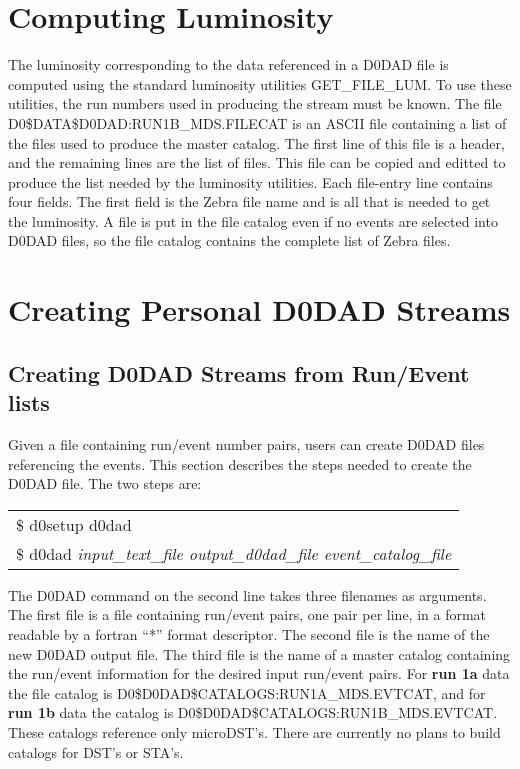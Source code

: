 \section{Computing Luminosity \label{ss-ug-lumi}}
\par
The luminosity corresponding to the data referenced in a D0DAD file is computed
using the standard luminosity utilities GET\_FILE\_LUM.  To use 
these utilities, the run numbers used in producing the
stream must be known.  The file { D0\$DATA\$D0DAD:RUN1B\_MDS.FILECAT} is an
ASCII file containing a list of the files used to produce the master catalog.
The first line of this file is a header, and the remaining lines are the
list of files.  This file can be copied and editted to produce the list needed
by the luminosity utilities.  Each file-entry line contains four fields.  The 
first field is the Zebra file name and is all that is needed to get the 
luminosity.  A file is put in the file catalog even if no events are selected
into D0DAD files, so the file catalog contains the complete list of Zebra 
files.

\section{Creating Personal D0DAD Streams \label{ss-ug-personal}}
\par
\subsection{Creating D0DAD Streams from Run/Event lists \label{sss-ug-personal}}
Given a file containing run/event number pairs, users can
create D0DAD files referencing the events.  This section describes the steps
needed to create the D0DAD file.  The two steps are:
\begin{center}
\begin{tabular}{l}
  \$ d0setup d0dad \\
  \$ d0dad {\em input\_text\_file output\_d0dad\_file event\_catalog\_file} \\
\end{tabular}
\end{center}
The D0DAD command on the second line takes three filenames as arguments.  The
first file is a file containing run/event pairs, one pair per line, in a format
readable by a fortran ``*'' format descriptor.  The second file is the name of
the new D0DAD output file.  The third file is the name of a master catalog 
containing the run/event information for the desired input run/event pairs.
For {\bf run 1a} data the file catalog is 
{ D0\$D0DAD\$CATALOGS:RUN1A\_MDS.EVTCAT}, and for {\bf run 1b} 
data the catalog is
{ D0\$D0DAD\$CATALOGS:RUN1B\_MDS.EVTCAT}.
These catalogs reference only microDST's.  There are currently no plans to 
build catalogs for DST's or STA's. 

